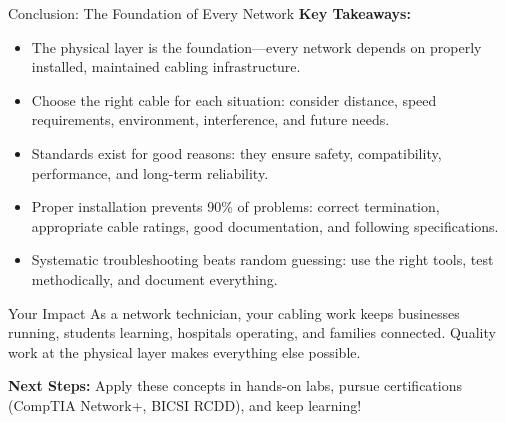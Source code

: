 \documentclass[aspectratio=169]{beamer}
\begin{document}
\begin{frame}{Conclusion: The Foundation of Every Network}
    \textbf{Key Takeaways:}
    \begin{itemize}
        \item The physical layer is the foundation---every network depends on properly installed, maintained cabling infrastructure.
        \item Choose the right cable for each situation: consider distance, speed requirements, environment, interference, and future needs.
        \item Standards exist for good reasons: they ensure safety, compatibility, performance, and long-term reliability.
        \item Proper installation prevents 90\% of problems: correct termination, appropriate cable ratings, good documentation, and following specifications.
        \item Systematic troubleshooting beats random guessing: use the right tools, test methodically, and document everything.
    \end{itemize}
    
    \vspace{0.3cm}
    \begin{block}{Your Impact}
        As a network technician, your cabling work keeps businesses running, students learning, hospitals operating, and families connected. Quality work at the physical layer makes everything else possible.
    \end{block}
    
    \vspace{0.2cm}
    \textbf{Next Steps:} Apply these concepts in hands-on labs, pursue certifications (CompTIA Network+, BICSI RCDD), and keep learning!
\end{frame}
\end{document}
